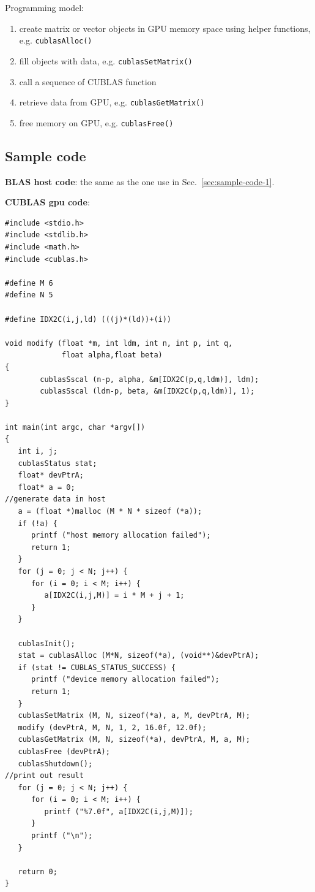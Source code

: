Programming model:
\begin{enumerate}
\item create matrix or vector objects in GPU memory space using helper
  functions, e.g. \verb!cublasAlloc()!
\item fill objects with data, e.g. \verb!cublasSetMatrix()!
\item call a sequence of CUBLAS function
\item retrieve data from GPU, e.g. \verb!cublasGetMatrix()!
\item free memory on GPU, e.g. \verb!cublasFree()!
\end{enumerate}

\subsection{Sample code}
\label{sec:sample-code}

{\bf BLAS host code}: the same as the one use in
Sec.~\ref{sec:sample-code-1}. 

{\bf CUBLAS gpu code}:
\begin{lstlisting}
#include <stdio.h>
#include <stdlib.h>
#include <math.h>
#include <cublas.h>

#define M 6
#define N 5

#define IDX2C(i,j,ld) (((j)*(ld))+(i))

void modify (float *m, int ldm, int n, int p, int q, 
             float alpha,float beta)
{
        cublasSscal (n-p, alpha, &m[IDX2C(p,q,ldm)], ldm);
        cublasSscal (ldm-p, beta, &m[IDX2C(p,q,ldm)], 1);
}

int main(int argc, char *argv[])
{
   int i, j;
   cublasStatus stat;
   float* devPtrA;
   float* a = 0;
//generate data in host
   a = (float *)malloc (M * N * sizeof (*a));
   if (!a) {
      printf ("host memory allocation failed");
      return 1;
   }
   for (j = 0; j < N; j++) {
      for (i = 0; i < M; i++) {
         a[IDX2C(i,j,M)] = i * M + j + 1;
      }
   }

   cublasInit();
   stat = cublasAlloc (M*N, sizeof(*a), (void**)&devPtrA);
   if (stat != CUBLAS_STATUS_SUCCESS) {
      printf ("device memory allocation failed");
      return 1;
   }
   cublasSetMatrix (M, N, sizeof(*a), a, M, devPtrA, M);
   modify (devPtrA, M, N, 1, 2, 16.0f, 12.0f);
   cublasGetMatrix (M, N, sizeof(*a), devPtrA, M, a, M);
   cublasFree (devPtrA);
   cublasShutdown();
//print out result
   for (j = 0; j < N; j++) {
      for (i = 0; i < M; i++) {
         printf ("%7.0f", a[IDX2C(i,j,M)]);
      }
      printf ("\n");
   }

   return 0;
}

\end{lstlisting}

